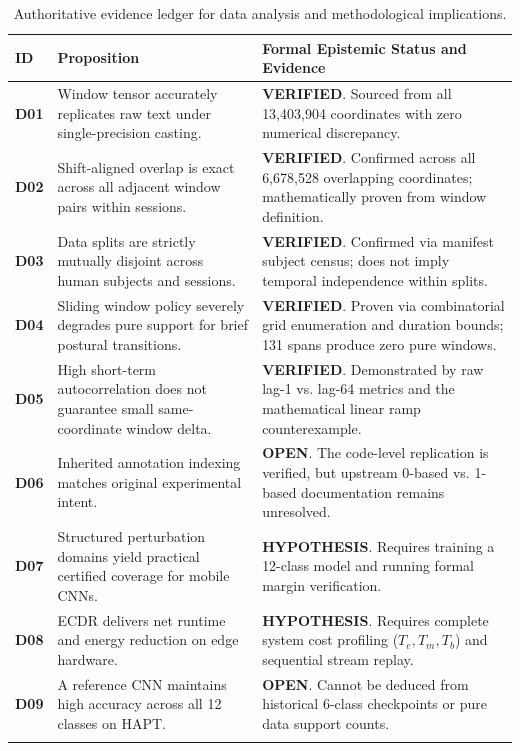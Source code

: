 \documentclass[11pt,a4paper]{article}
\theoremstyle{definition}
\begin{document}
\begin{longtable}{@{}P{1.0cm}P{6.0cm}P{5.7cm}@{}}\toprule
ID & Proposition & Formal Epistemic Status and Evidence\\\midrule\endhead
\textbf{D01} & Window tensor accurately replicates raw text under single-precision casting. & \textbf{VERIFIED}. Sourced from all 13,403,904 coordinates with zero numerical discrepancy.\\
\textbf{D02} & Shift-aligned overlap is exact across all adjacent window pairs within sessions. & \textbf{VERIFIED}. Confirmed across all 6,678,528 overlapping coordinates; mathematically proven from window definition.\\
\textbf{D03} & Data splits are strictly mutually disjoint across human subjects and sessions. & \textbf{VERIFIED}. Confirmed via manifest subject census; does not imply temporal independence within splits.\\
\textbf{D04} & Sliding window policy severely degrades pure support for brief postural transitions. & \textbf{VERIFIED}. Proven via combinatorial grid enumeration and duration bounds; 131 spans produce zero pure windows.\\
\textbf{D05} & High short-term autocorrelation does not guarantee small same-coordinate window delta. & \textbf{VERIFIED}. Demonstrated by raw lag-1 vs. lag-64 metrics and the mathematical linear ramp counterexample.\\
\textbf{D06} & Inherited annotation indexing matches original experimental intent. & \textbf{OPEN}. The code-level replication is verified, but upstream 0-based vs. 1-based documentation remains unresolved.\\
\textbf{D07} & Structured perturbation domains yield practical certified coverage for mobile CNNs. & \textbf{HYPOTHESIS}. Requires training a 12-class model and running formal margin verification.\\
\textbf{D08} & ECDR delivers net runtime and energy reduction on edge hardware. & \textbf{HYPOTHESIS}. Requires complete system cost profiling ($T_e, T_m, T_b$) and sequential stream replay.\\
\textbf{D09} & A reference CNN maintains high accuracy across all 12 classes on HAPT. & \textbf{OPEN}. Cannot be deduced from historical 6-class checkpoints or pure data support counts.\\\bottomrule
\caption{Authoritative evidence ledger for data analysis and methodological implications.}\label{tab:evidence_ledger}
\end{longtable}
\end{document}
